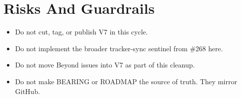 \section{Risks And Guardrails}\label{record-209-risks-and-guardrails}

\begin{itemize}
\tightlist
\item
  Do not cut, tag, or publish V7 in this cycle.
\item
  Do not implement the broader tracker-sync sentinel from \#268 here.
\item
  Do not move Beyond issues into V7 as part of this cleanup.
\item
  Do not make BEARING or ROADMAP the source of truth. They mirror GitHub.
\end{itemize}


